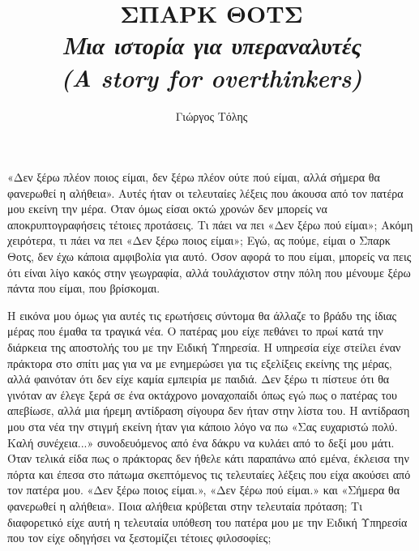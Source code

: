 \documentclass[12pt,twoside, openany]{book}
\begin{document}
\frontmatter

\title{
\Huge ΣΠΑΡΚ ΘΟΤΣ\\[0.5em]
\large\itshape Μια ιστορία για υπεραναλυτές\\
\normalsize\itshape (A story for overthinkers)
}
\author{Γιώργος Τόλης}
\date{}
\mainmatter


\maketitle

\cleardoublepage

\tableofcontents

\cleardoublepage

\chapter{}

«Δεν ξέρω πλέον ποιος είμαι, δεν ξέρω πλέον ούτε πού είμαι, αλλά σήμερα θα φανερωθεί η αλήθεια». Αυτές ήταν οι τελευταίες λέξεις που άκουσα από τον πατέρα μου εκείνη την μέρα. Όταν όμως είσαι οκτώ χρονών δεν μπορείς να αποκρυπτογραφήσεις τέτοιες προτάσεις. Τι πάει να πει «Δεν ξέρω πού είμαι»; Ακόμη χειρότερα, τι πάει να πει «Δεν ξέρω ποιος είμαι»; Εγώ, ας πούμε, είμαι ο Σπαρκ Θοτς, δεν έχω κάποια αμφιβολία για αυτό. Όσον αφορά το που είμαι, μπορείς να πεις ότι είναι λίγο κακός στην γεωγραφία, αλλά τουλάχιστον στην πόλη που μένουμε ξέρω πάντα που είμαι, που βρίσκομαι.

Η εικόνα μου όμως για αυτές τις ερωτήσεις σύντομα θα άλλαζε το βράδυ της ίδιας μέρας που έμαθα τα τραγικά νέα. Ο πατέρας μου είχε πεθάνει το πρωί κατά την διάρκεια της αποστολής του με την Ειδική Υπηρεσία. Η υπηρεσία είχε στείλει έναν πράκτορα στο σπίτι μας για να με ενημερώσει για τις εξελίξεις εκείνης της μέρας, αλλά φαινόταν ότι δεν είχε καμία εμπειρία με παιδιά. Δεν ξέρω τι πίστευε ότι θα γινόταν αν έλεγε ξερά σε ένα οκτάχρονο μοναχοπαίδι όπως εγώ πως ο πατέρας του απεβίωσε, αλλά μια ήρεμη αντίδραση σίγουρα δεν ήταν στην λίστα του. Η αντίδραση μου στα νέα την στιγμή εκείνη ήταν για κάποιο λόγο να πω «Σας ευχαριστώ πολύ. Καλή συνέχεια...» συνοδευόμενος από ένα δάκρυ να κυλάει από το δεξί μου μάτι. Όταν τελικά είδα πως ο πράκτορας δεν ήθελε κάτι παραπάνω από εμένα, έκλεισα την πόρτα και έπεσα στο πάτωμα σκεπτόμενος τις τελευταίες λέξεις που είχα ακούσει από τον πατέρα μου. «Δεν ξέρω ποιος είμαι.», «Δεν ξέρω πού είμαι.» και «Σήμερα θα φανερωθεί η αλήθεια». Ποια αλήθεια κρύβεται στην τελευταία πρόταση; Τι διαφορετικό είχε αυτή η τελευταία υπόθεση του πατέρα μου με την Ειδική Υπηρεσία που τον είχε οδηγήσει να ξεστομίζει τέτοιες φιλοσοφίες; 
\end{document}
